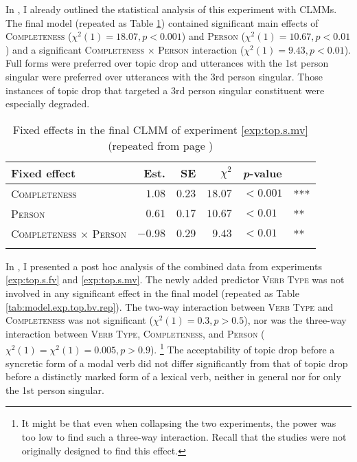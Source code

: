 \noindent
In , I already outlined the statistical analysis of this experiment with CLMMs.
The final model (repeated as Table \ref{tab:model.exp.top.mv.rep}) contained significant main effects of \textsc{Completeness} ($\chi^2(1) = 18.07, p < 0.001$) and \textsc{Person} ($\chi^2(1) = 10.67, p < 0.01$) and a significant \textsc{Completeness} $\times$ \textsc{Person} interaction ($\chi^2(1) = 9.43, p < 0.01$).
Full forms were preferred over topic drop and utterances with the 1st person singular were preferred over utterances with the 3rd person singular.
Those instances of topic drop that targeted a 3rd person singular constituent were especially degraded.

\begin{table}
\caption{Fixed effects in the final CLMM of experiment \ref*{exp:top.s.mv} (repeated from page \pageref{tab:model.exp.top.mv})}
\centering
\begin{tabular}{lrrrll}
\lsptoprule
Fixed effect & Est. & SE & $\chi^2$ & \textit{p}-value &   \\
\midrule
\textsc{Completeness} & $1.08$ & $0.23$ & $18.07$ & $< 0.001$ & ***\\
\textsc{Person} & $0.61$ & $0.17$ & $10.67$ & $< 0.01$ & **\\
\textsc{Completeness $\times$ Person} & $-0.98$ & $0.29$ & $9.43$ & $< 0.01$ & **\\
\lspbottomrule
\end{tabular}
\label{tab:model.exp.top.mv.rep}
\end{table}

 
In , I presented a post hoc analysis of the combined data from experiments \ref*{exp:top.s.fv} and \ref*{exp:top.s.mv}.
The newly added predictor \textsc{Verb Type} was not involved in any significant effect in the final model (repeated as Table \ref{tab:model.exp.top.bv.rep}).
The two-way interaction between \textsc{Verb Type} and \textsc{Completeness} was not significant ($\chi^2(1) = 0.3, p > 0.5$), nor was the three-way interaction between \textsc{Verb Type}, \textsc{Completeness}, and \textsc{Person} ($\chi^2(1) = \chi^2(1) = 0.005, p > 0.9$).%
\footnote{It might be that even when collapsing the two experiments, the power was too low to find such a three-way interaction.
Recall that the studies were not originally designed to find this effect.}
%
The acceptability of topic drop before a syncretic  form of a modal verb did not differ significantly from that of topic drop before a distinctly marked form of a lexical verb,  neither in general nor for only the 1st person singular.

